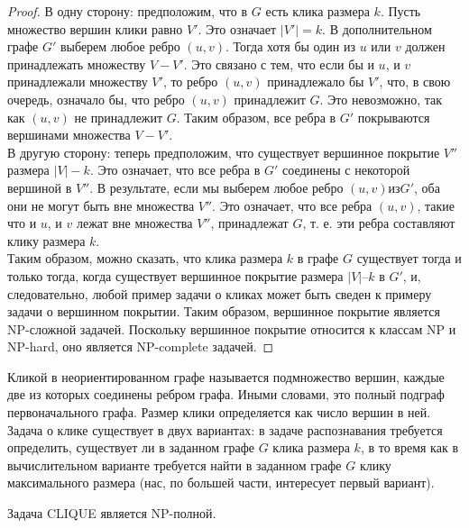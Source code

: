 \begin{proof}
        В одну сторону: предположим, что в $G$ есть клика размера $k$. Пусть множество вершин клики равно $V'$. Это означает $|V'| = k$. В дополнительном графе $G'$ выберем любое ребро $(u, v)$. Тогда хотя бы один из $u$ или $v$ должен принадлежать множеству $V - V'$. Это связано с тем, что если бы и $u$, и $v$ принадлежали множеству $V'$, то ребро $(u, v)$ принадлежало бы $V'$, что, в свою очередь, означало бы, что ребро $(u, v)$ принадлежит $G$. Это невозможно, так как $(u, v)$ не принадлежит $G$. Таким образом, все ребра в $G'$ покрываются вершинами множества $V - V'$.\\
        В другую сторону: теперь предположим, что существует вершинное покрытие $V''$ размера $|V| - k$. Это означает, что все ребра в $G'$ соединены с некоторой вершиной в $V''$. В результате, если мы выберем любое ребро $(u, v) из G'$, оба они не могут быть вне множества $V''$. Это означает, что все
        ребра $(u, v)$, такие что и $u$, и $v$ лежат вне множества $V''$, принадлежат $G$, т. е. эти ребра составляют клику размера $k$.\\
        Таким образом, можно сказать, что клика размера $k$ в графе $G$ существует тогда и только тогда, когда существует вершинное покрытие размера $|V| – k$ в $G'$, и, следовательно, любой пример задачи о кликах может быть сведен к примеру задачи о вершинном покрытии. Таким образом, вершинное покрытие является NP-сложной задачей. Поскольку вершинное покрытие относится к классам NP и NP-hard, оно является NP-complete задачей.


    \end{proof}
    \begin{Def}
        Кликой в неориентированном графе называется подмножество вершин, каждые две из которых соединены ребром графа. Иными словами, это полный подграф первоначального графа. Размер клики определяется как число вершин в ней. Задача о клике существует в двух вариантах: в задаче распознавания требуется определить, существует ли в заданном графе $G$ клика размера $k$, в то время как в вычислительном варианте требуется найти в заданном графе $G$ клику максимального размера (нас, по большей части, интересует первый вариант).
    \end{Def}
    \begin{Thm}
        Задача CLIQUE является NP-полной.
    \end{Thm}
